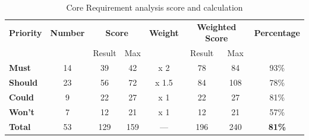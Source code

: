 \begin{table}[H]
    \centering
    \begin{tabular}{|l|c|cc|c|cc|c|}\hline
        \textbf{Priority}& \textbf{Number}& \multicolumn{2}{c|}{\textbf{Score}} & \textbf{Weight}& \multicolumn{2}{c|}{\textbf{Weighted Score}}&\textbf{Percentage}\\
        & & Result & Max & & Result & Max & \\\hline
        \textbf{Must}   & 14 &  39 &  42 & x 2   &  78 &  84 & 93\% \\
        \textbf{Should} & 23 &  56 &  72 & x 1.5 &  84 & 108 & 78\% \\
        \textbf{Could}  &  9 &  22 &  27 & x 1   &  22 &  27 & 81\% \\
        \textbf{Won't}  &  7 &  12 &  21 & x 1   &  12 &  21 & 57\% \\ \hline
        \textbf{Total}  & 53 & 129 & 159 &   --- & 196 & 240 & \textbf{81\%} \\ \hline
    \end{tabular}
    \caption{Core Requirement analysis score and calculation}
    \label{tab:App-ReqAnalysisResults}
\end{table}
